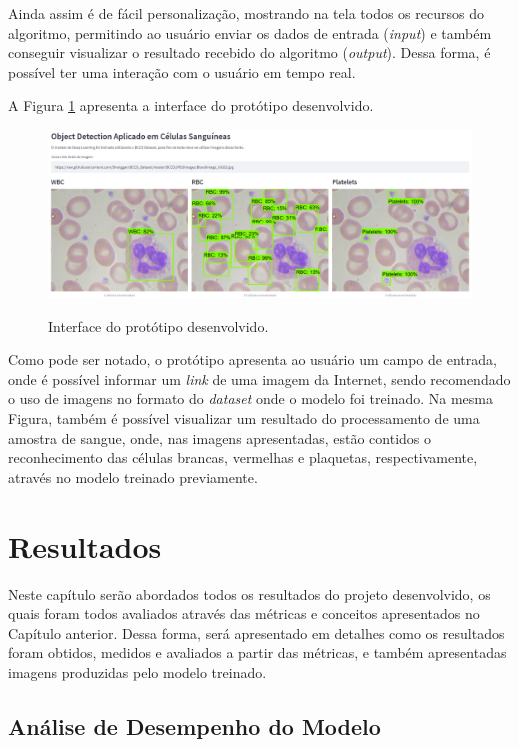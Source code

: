 Ainda assim é de fácil personalização, mostrando na tela todos os recursos do algoritmo, permitindo ao usuário enviar os dados de entrada (\emph{input}) e também conseguir visualizar o resultado recebido do algoritmo (\emph{output}). Dessa forma, é possível ter uma interação com o usuário em tempo real.

A Figura \ref{fig:prototipo} apresenta a interface do protótipo desenvolvido.

\begin{figure}[!htb]
	\centering
	\caption{Interface do protótipo desenvolvido.}
	\includegraphics[width=1.0\textwidth]{img/prototipo.png}
	\label{fig:prototipo}
\end{figure}

Como pode ser notado, o protótipo apresenta ao usuário um campo de entrada, onde é possível informar um \emph{link} de uma imagem da Internet, sendo recomendado o uso de imagens no formato do \emph{dataset} onde o modelo foi treinado. Na mesma Figura, também é possível visualizar um resultado do processamento de uma amostra de sangue, onde, nas imagens apresentadas, estão contidos o reconhecimento das células brancas, vermelhas e plaquetas, respectivamente, através no modelo treinado previamente.

\chapter{Resultados}
\label{chap:resultados}
Neste capítulo serão abordados todos os resultados do projeto desenvolvido, os quais foram todos avaliados através das métricas e conceitos apresentados no Capítulo anterior. Dessa forma, será apresentado em detalhes como os resultados foram obtidos, medidos e avaliados a partir das métricas, e também apresentadas imagens produzidas pelo modelo treinado. 

\section{Análise de Desempenho do Modelo}

